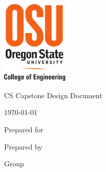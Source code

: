\def \DocType{		%
				Design Document
				}

\begin{titlepage}
    \begin{singlespace}
    	\includegraphics[height=4cm]{coe_v_spot1}
        \hfill 
        \par\vspace{.2in}
        \centering
        \scshape{
            \huge CS Capstone \DocType \par
            {\large\today}\par
            \vspace{.5in}
            \textbf{\Huge\CapstoneProjectName}\par
            \vfill
            {\large Prepared for}\par
            \Huge \CapstoneSponsorCompany\par
            \vspace{5pt}
            {\Large
                \NameSigPair{\CapstoneSponsorPersonTwo}\par
            }
            {\large Prepared by }\par
            Group\CapstoneTeamNumber\par
            \CapstoneTeamName\par 
            \vspace{5pt}
            {\Large
                \NameSigPair{\GroupMemberOne}\par
                \NameSigPair{\GroupMemberTwo}\par
                \NameSigPair{\GroupMemberThree}\par
            }
            \vspace{20pt}
        }
        \begin{abstract}

\end{abstract}
\end{singlespace}
\end{titlepage}
